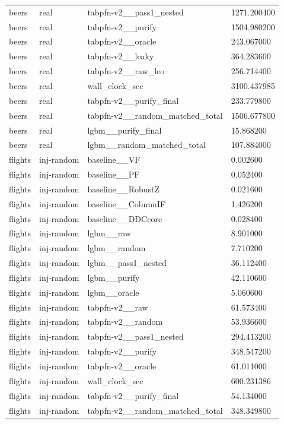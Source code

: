 \begin{tabular}{llll}
beers & real & tabpfn-v2\_\_pass1\_nested & 1271.200400 \\
beers & real & tabpfn-v2\_\_purify & 1504.980200 \\
beers & real & tabpfn-v2\_\_oracle & 243.067000 \\
beers & real & tabpfn-v2\_\_leaky & 364.283600 \\
beers & real & tabpfn-v2\_\_raw\_leo & 256.714400 \\
beers & real & wall\_clock\_sec & 3100.437985 \\
beers & real & tabpfn-v2\_\_purify\_final & 233.779800 \\
beers & real & tabpfn-v2\_\_random\_matched\_total & 1506.677800 \\
beers & real & lgbm\_\_purify\_final & 15.868200 \\
beers & real & lgbm\_\_random\_matched\_total & 107.884000 \\
flights & inj-random & baseline\_\_VF & 0.002600 \\
flights & inj-random & baseline\_\_PF & 0.052400 \\
flights & inj-random & baseline\_\_RobustZ & 0.021600 \\
flights & inj-random & baseline\_\_ColumnIF & 1.426200 \\
flights & inj-random & baseline\_\_DDCcore & 0.028400 \\
flights & inj-random & lgbm\_\_raw & 8.901000 \\
flights & inj-random & lgbm\_\_random & 7.710200 \\
flights & inj-random & lgbm\_\_pass1\_nested & 36.112400 \\
flights & inj-random & lgbm\_\_purify & 42.110600 \\
flights & inj-random & lgbm\_\_oracle & 5.060600 \\
flights & inj-random & tabpfn-v2\_\_raw & 61.573400 \\
flights & inj-random & tabpfn-v2\_\_random & 53.936600 \\
flights & inj-random & tabpfn-v2\_\_pass1\_nested & 294.413200 \\
flights & inj-random & tabpfn-v2\_\_purify & 348.547200 \\
flights & inj-random & tabpfn-v2\_\_oracle & 61.011000 \\
flights & inj-random & wall\_clock\_sec & 600.231386 \\
flights & inj-random & tabpfn-v2\_\_purify\_final & 54.134000 \\
flights & inj-random & tabpfn-v2\_\_random\_matched\_total & 348.349800 \\

\end{tabular}
